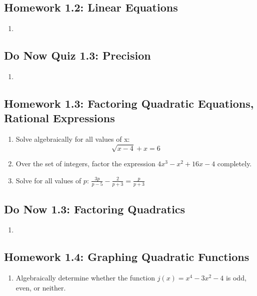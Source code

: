 \documentclass[12pt, oneside]{article}
\begin{document}
\newpage
\subsection*{Homework 1.2: Linear Equations}
\begin{enumerate}
  \item
\end{enumerate}

\newpage
\subsection*{Do Now Quiz 1.3: Precision}
\begin{enumerate}
  \item
\end{enumerate}

\newpage
\subsection*{Homework 1.3: Factoring Quadratic Equations, Rational Expressions}

\begin{enumerate}
\item %
Solve algebraically for all values of x:
\[\sqrt{x-4}+x=6\]

\item %
Over the set of integers, factor the expression $4x^3 - x^2 +16x - 4$ completely.


\item %
Solve for all values of $p$:
$\displaystyle \frac{3p}{p-5}-\frac{2}{p+3}=\frac{p}{p+3}$
\end{enumerate}


\newpage
\subsection*{Do Now 1.3: Factoring Quadratics}
\begin{enumerate}
  \item
\end{enumerate}

\newpage
\subsection*{Homework 1.4: Graphing Quadratic Functions}
\begin{enumerate}
  \emph{Spicy}
  \item %
  Algebraically determine whether the function $j(x)=x^4 - 3x^2 -4$ is odd, even, or neither.

\end{enumerate}
\end{document}
